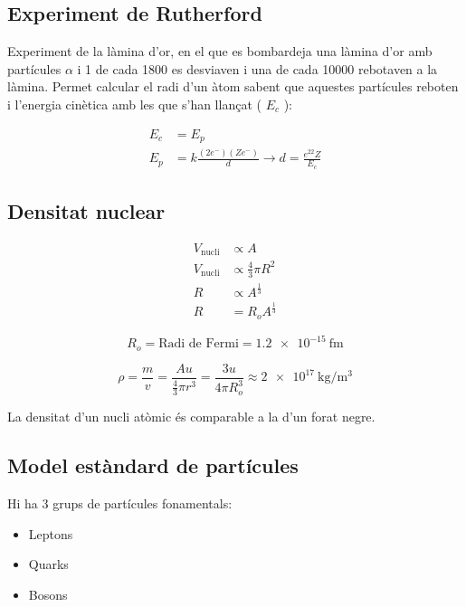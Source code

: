 \subsection{Experiment de Rutherford}
\label{sub:experiment_de_rutherford}

Experiment de la làmina d'or, en el que es bombardeja una làmina d'or amb
partícules $\alpha$ i 1 de cada 1800 es desviaven i una de cada 10000 rebotaven
a la làmina.  Permet calcular el radi d'un àtom sabent que aquestes partícules
reboten i l'energia cinètica amb les que s'han llançat ( $E_c$ ):

\begin{align}
    E_c &= E_p \nonumber \\
    E_p &= k\frac{(2e^-)(Ze^-)}{d} \rightarrow d = \frac{e^22Z}{E_c}
\end{align}

\subsection{Densitat nuclear}
\label{sub:densitat_nuclear}

\begin{align}
    V_{\text{nucli}} &\propto A \\
    V_{\text{nucli}} &\propto \frac{4}{3}\pi R^2 \\
    R &\propto A^{\frac{1}{3}} \\
    R &= R_oA^{\frac{1}{3}}
\end{align}

\begin{equation}
    R_o = \text{Radi de Fermi} = \SI{1,2e-15}{\femto\meter}
\end{equation}

\begin{equation}
    \rho = \frac{m}{v} = \frac{Au}{\frac{4}{3}\pi r^3} = \frac{3u}{4\pi R_o^3} \approx \SI{2e17}{\kilo\gram\per\metre\cubed}
\end{equation}

La densitat d'un nucli atòmic és comparable a la d'un forat negre.

\subsection{Model estàndard de partícules}
\label{sub:model_estandard_de_particules}

Hi ha 3 grups de partícules fonamentals:

\begin{itemize}
    \item Leptons
    \item Quarks
    \item Bosons
\end{itemize}

